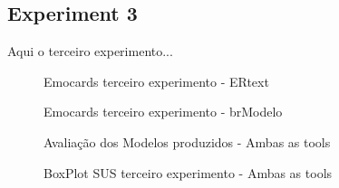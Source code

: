 \cleardoublepage

\subsection{Experiment 3}
\label{ssec_experiments:Experiment3}
Aqui o terceiro experimento...

\begin{figure}[!htb]
    \centering
    \caption{Emocards terceiro experimento - ERtext}
    \label{fig:Emocards4_alt}
    
\end{figure}

\begin{figure}[!htb]
    \centering
    \caption{Emocards terceiro experimento - brModelo}
    \label{fig:Emocards3_alt}
    
\end{figure}

\begin{figure}[!htb]
    \centering
    \caption{Avaliação dos Modelos produzidos - Ambas as tools}
    \label{fig:ToolModelsEval}
    
\end{figure}

%     

%     

%     

\begin{figure}[!htb]
    \centering
    \caption{BoxPlot SUS terceiro experimento - Ambas as tools}
    \label{fig:BoxPlotSUS_tools}
    
\end{figure}

